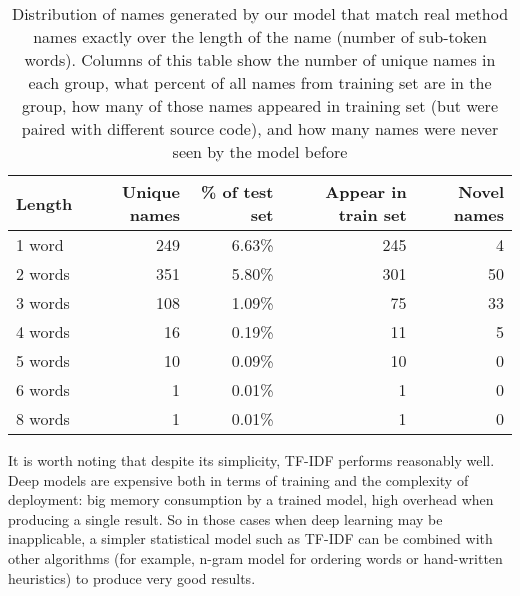 \begin{table}[H]
\centering
\begin{tabular}{|l|r|r|r|r|}
  \hline
  \textbf{Length} & \textbf{Unique names} & \textbf{\% of test set} & \textbf{Appear in train set} & \textbf{Novel names} \\
  \hline
  1 word & 249 & 6.63\% & 245 & 4 \\
  \hline
  2 words & 351 & 5.80\% & 301 & 50 \\
  \hline
  3 words & 108 & 1.09\% & 75 & 33 \\
  \hline
  4 words & 16 & 0.19\% & 11 & 5 \\
  \hline
  5 words & 10 & 0.09\% & 10 & 0 \\
  \hline
  6 words & 1 & 0.01\% & 1 & 0 \\
  \hline
  8 words & 1 & 0.01\% & 1 & 0 \\
  \hline
\end{tabular}
\caption{Distribution of names generated by our model that match real method names exactly over the length of the name (number of sub-token words). Columns of this table show the number of unique names in each group, what percent of all names from training set are in the group, how many of those names appeared in training set (but were paired with different source code), and how many names were never seen by the model before}
\label{tab:Evaluation-ExactMatches}
\end{table}

It is worth noting that despite its simplicity, TF-IDF performs reasonably well. Deep models are expensive both in terms of training and the complexity of deployment: big memory consumption by a trained model, high overhead when producing a single result. So in those cases when deep learning may be inapplicable, a simpler statistical model such as TF-IDF can be combined with other algorithms (for example, n-gram model for ordering words or hand-written heuristics) to produce very good results.

%
%
